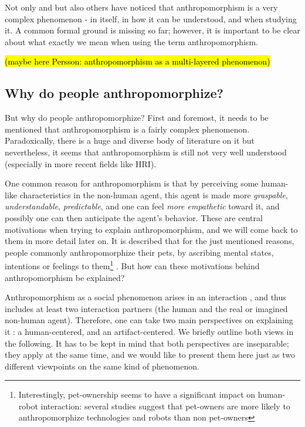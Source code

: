 \documentclass{frontiersSCNS} %
\begin{document}
Not only \cite{epley_when_2008} and \cite{duffy_anthropomorphism_2002} but also others have noticed that anthropomorphism is a very complex phenomenon - in itself, in how it can be understood, and when studying it.
A common formal ground is missing so far; however, it is important to be clear about what exactly we mean when using the term anthropomorphism.

\hl{(maybe here Persson: anthropomorphism as a multi-layered phenomenon)}


%
%
%
%
%
%

\subsection{Why do people anthropomorphize?}
\label{sec:explanations}

But why do people anthropomorphize? First and foremost, it needs to be mentioned that anthropomorphism is a fairly complex phenomenon. Paradoxically, there is a huge and diverse body of literature on it but nevertheless, it seems that anthropomorphism is still not very well understood (especially in more recent fields like HRI).

One common reason for anthropomorphism is that by perceiving some human-like characteristics in the non-human agent, this agent is made more \emph{graspable}, \emph{understandable}, \emph{predictable}, and one can feel \emph{more empathetic} toward it, and possibly one can then anticipate the agent's behavior. These are central motivations when trying to explain anthropomorphism, and we will come back to them in more detail later on. 
It is described that for the just mentioned reasons, people commonly anthropomorphize their pets, by ascribing mental states, intentions or feelings to them\footnote{Interestingly, pet-ownership seems to have a significant impact on human-robot interaction: several studies suggest that pet-owners are more likely to anthropomorphize technologies and robots than non pet-owners} \cite{eddy_attribution_1993}. But how can these motivations behind anthropomorphism be explained?

Anthropomorphism as a social phenomenon arises in an interaction \citep{persson_anthropomorphism_2000}, and thus includes at least two interaction partners (the human and the real or imagined non-human agent). Therefore, one can take two main perspectives on explaining it \citep{lee_human_2005}: a human-centered, and an artifact-centered. We briefly outline both views in the following. It has to be kept in mind that both perspectives are inseparable; they apply at the same time, and we would like to present them here just as two different viewpoints on the same kind of phenomenon.
\end{document}
